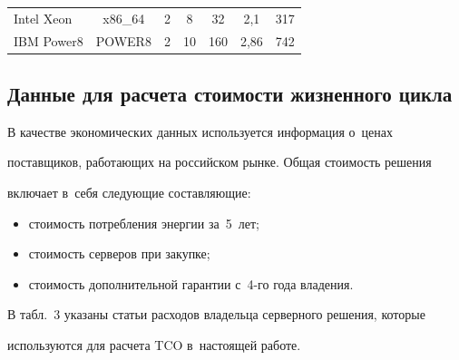 \begin{table}
\begin{center}
\begin{tabular}{|l|c|c|c|c|c|c|}
\hline

Intel Xeon&  x86\_64 & 2& \hphantom{9}8& \hphantom{9}32& 2,1\hphantom{9}& 317\\

IBM Power8& POWER8& 2& 10& 160& 2,86& 742\\

\hline

\end{tabular}

\end{center}

\vspace*{-12pt}

\end{table}



\subsection{Данные для расчета стоимости жизненного цикла}



\vspace*{-2pt}

     

  В качестве экономических данных используется информация о~ценах 

поставщиков, работающих на российском рынке. Общая стоимость решения 

включает в~себя сле\-ду\-ющие со\-став\-ля\-ющие:

  \begin{itemize}

\item стоимость потребления энергии за~5~лет;\\[-13.5pt]

\item стоимость серверов при закупке;\\[-13.5pt]

\item стоимость дополнительной гарантии с~4-го года владения.

\end{itemize}

  

  В табл.~3 указаны статьи расходов владельца серверного решения, которые 

используются для расчета TCO в~на\-сто\-ящей работе.

  

